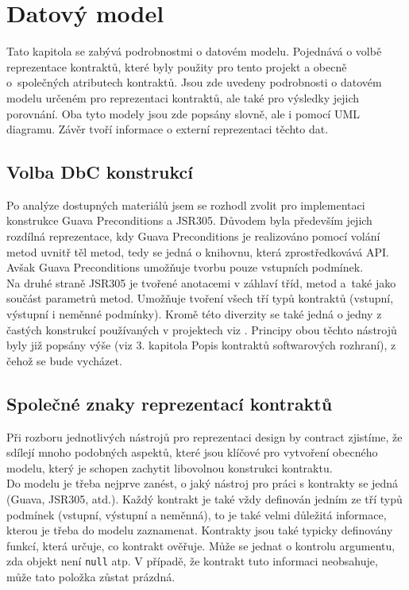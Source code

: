 \chapter{Datový model}
	Tato kapitola se zabývá podrobnostmi o datovém modelu. Pojednává o volbě reprezentace kontraktů, které byly použity pro tento projekt a obecně o~společných atributech kontraktů. Jsou zde uvedeny podrobnosti o datovém modelu určeném pro reprezentaci kontraktů, ale také pro výsledky jejich porovnání. Oba tyto modely jsou zde popsány slovně, ale i pomocí UML diagramu. Závěr tvoří informace o externí reprezentaci těchto dat.

	\section{Volba DbC konstrukcí}
		Po analýze dostupných materiálů jsem se rozhodl zvolit pro implementaci konstrukce Guava Preconditions a JSR305. Důvodem byla především jejich rozdílná reprezentace, kdy Guava Preconditions je realizováno pomocí volání metod uvnitř těl metod, tedy se jedná o knihovnu, která zprostředkovává API. Avšak Guava Preconditions umožňuje tvorbu pouze vstupních podmínek.\\
		
		 Na druhé straně JSR305 je tvořené anotacemi v záhlaví tříd, metod a~také jako součást parametrů metod. Umožňuje tvoření všech tří typů kontraktů (vstupní, výstupní i neměnné podmínky). Kromě této diverzity se také jedná o jedny z častých konstrukcí používaných v projektech viz \cite{contractsInWild}. Principy obou těchto nástrojů byly již popsány výše (viz 3. kapitola Popis kontraktů softwarových rozhraní), z čehož se bude vycházet.
				
				
	\section{Společné znaky reprezentací kontraktů}		
		Při rozboru jednotlivých nástrojů pro reprezentaci design by contract zjistíme, že sdílejí mnoho podobných aspektů, které jsou klíčové pro vytvoření obecného modelu, který je schopen zachytit libovolnou konstrukci kontraktu.\\ 
		
		Do modelu je třeba nejprve zanést, o jaký nástroj pro práci s kontrakty se jedná (Guava, JSR305, atd.). Každý kontrakt je také vždy definován jedním ze tří typů podmínek (vstupní, výstupní a neměnná), to je také velmi důležitá informace, kterou je třeba do modelu zaznamenat. Kontrakty jsou také typicky definovány funkcí, která určuje, co kontrakt ověřuje. Může se jednat o kontrolu argumentu, zda objekt není \texttt{null} atp. V případě, že kontrakt tuto informaci neobsahuje, může tato položka zůstat prázdná.\\
		
